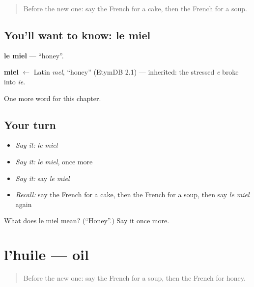 \label{lesson:FR-C69-miel}



\begin{quote}
Before the new one: say the French for a cake, then the French for a soup.
\end{quote}

\subsection*{You'll want to know: le miel}
\textbf{le miel} — \textquotedblleft{}honey\textquotedblright{}.

\begin{cousinweb}
\textbf{miel} $\leftarrow$ Latin \emph{mel}, \textquotedblleft{}honey\textquotedblright{} (EtymDB 2.1) — inherited: the stressed \emph{e} broke into \emph{ie}.
\end{cousinweb}

\begin{grammarlens}[title={What you've built}]
One more word for this chapter.
\end{grammarlens}

\subsection*{Your turn}
\begin{itemize}
\raggedright
  \item \emph{Say it:} \emph{le miel}
  \item \emph{Say it:} \emph{le miel}, once more
  \item \emph{Say it:} say \emph{le miel}
  \item \emph{Recall:} say the French for a cake, then the French for a soup, then say \emph{le miel} again
\end{itemize}

\begin{tcolorbox}[breakable,colback=teal!4,colframe=teal!35!black,title={Before you move on}]
What does le miel mean? (\textquotedblleft{}Honey\textquotedblright{}.) Say it once more.
\end{tcolorbox}
\section[l'huile]{l'huile — oil}

\label{lesson:FR-C69-huile}



\begin{quote}
Before the new one: say the French for a soup, then the French for honey.
\end{quote}

